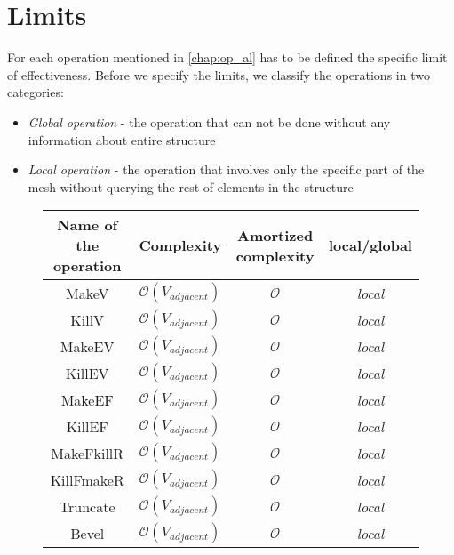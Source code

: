 \section{Limits}

For each operation mentioned in \ref{chap:op_al} has to be defined the specific limit
of effectiveness. Before we specify the limits, we classify the operations in two categories:

\begin{itemize}
\item \emph{Global operation} - the operation that can not be done without any information
about entire structure
\item \emph{Local operation} - the operation that involves only the specific part of the mesh
without querying the rest of elements in the structure
\end{itemize}

\begin{figure}[!hbf]

\centering
\begin{tabular}{| c | c | c | c |}
\hline
\textbf{Name of the operation} & \textbf{Complexity} & \textbf{Amortized complexity} & \textbf{local/global}\\
\hline
MakeV & $\mathcal{O}(V_{adjacent})$ & $\mathcal{O}$ & \emph{local}\\
\hline
KillV & $\mathcal{O}(V_{adjacent})$ & $\mathcal{O}$ & \emph{local}\\
\hline
MakeEV & $\mathcal{O}(V_{adjacent})$ & $\mathcal{O}$ & \emph{local}\\
\hline
KillEV & $\mathcal{O}(V_{adjacent})$ & $\mathcal{O}$ & \emph{local}\\
\hline
MakeEF & $\mathcal{O}(V_{adjacent})$ & $\mathcal{O}$ & \emph{local}\\
\hline
KillEF & $\mathcal{O}(V_{adjacent})$ & $\mathcal{O}$ & \emph{local}\\
\hline
MakeFkillR & $\mathcal{O}(V_{adjacent})$ & $\mathcal{O}$ & \emph{local}\\
\hline
KillFmakeR & $\mathcal{O}(V_{adjacent})$ & $\mathcal{O}$ & \emph{local}\\
\hline
Truncate & $\mathcal{O}(V_{adjacent})$ & $\mathcal{O}$ & \emph{local}\\
\hline
Bevel & $\mathcal{O}(V_{adjacent})$ & $\mathcal{O}$ & \emph{local}\\
\hline
\end{tabular}

\end{figure}